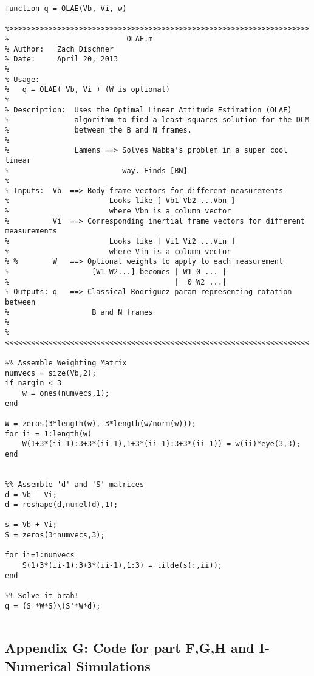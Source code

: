 \documentclass[11pt]{aiaa-tc}%
\begin{document}
\label{APP:OLAE}
\begin{lstlisting}
function q = OLAE(Vb, Vi, w)

%>>>>>>>>>>>>>>>>>>>>>>>>>>>>>>>>>>>>>>>>>>>>>>>>>>>>>>>>>>>>>>>>>>>>> 
%                           OLAE.m
% Author:   Zach Dischner
% Date:     April 20, 2013
% 
% Usage:
%   q = OLAE( Vb, Vi ) (W is optional)
%
% Description:  Uses the Optimal Linear Attitude Estimation (OLAE)
%               algorithm to find a least squares solution for the DCM 
%               between the B and N frames. 
% 
%               Lamens ==> Solves Wabba's problem in a super cool linear 
%                          way. Finds [BN] 
% 
% Inputs:  Vb  ==> Body frame vectors for different measurements
%                       Looks like [ Vb1 Vb2 ...Vbn ]
%                       where Vbn is a column vector
%          Vi  ==> Corresponding inertial frame vectors for different measurements
%                       Looks like [ Vi1 Vi2 ...Vin ]
%                       where Vin is a column vector
% %        W   ==> Optional weights to apply to each measurement
%                   [W1 W2...] becomes | W1 0 ... |
%                                      |  0 W2 ...|
% Outputs: q   ==> Classical Rodriguez param representing rotation between
%                   B and N frames
% 
%<<<<<<<<<<<<<<<<<<<<<<<<<<<<<<<<<<<<<<<<<<<<<<<<<<<<<<<<<<<<<<<<<<<<<<

%% Assemble Weighting Matrix
numvecs = size(Vb,2);
if nargin < 3
    w = ones(numvecs,1);
end

W = zeros(3*length(w), 3*length(w/norm(w)));
for ii = 1:length(w)
    W(1+3*(ii-1):3+3*(ii-1),1+3*(ii-1):3+3*(ii-1)) = w(ii)*eye(3,3);
end


%% Assemble 'd' and 'S' matrices
d = Vb - Vi;
d = reshape(d,numel(d),1);

s = Vb + Vi;
S = zeros(3*numvecs,3);

for ii=1:numvecs
    S(1+3*(ii-1):3+3*(ii-1),1:3) = tilde(s(:,ii));
end

%% Solve it brah!
q = (S'*W*S)\(S'*W*d);


\end{lstlisting}




\subsection{Appendix G: Code for part F,G,H and I-Numerical Simulations}
\end{document}
